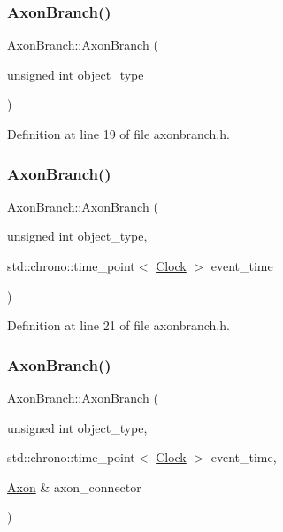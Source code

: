 \subsubsection{\texorpdfstring{Axon\+Branch()}{AxonBranch()}\hspace{0.1cm}{\footnotesize\ttfamily [2/4]}}
{\footnotesize\ttfamily Axon\+Branch\+::\+Axon\+Branch (\begin{DoxyParamCaption}\item[{unsigned int}]{object\+\_\+type }\end{DoxyParamCaption})\hspace{0.3cm}{\ttfamily [inline]}}



Definition at line 19 of file axonbranch.\+h.

\mbox{\label{class_axon_branch_ad6191fcfd8bedc058a4f1cfb5056f5b2}} 
\subsubsection{\texorpdfstring{Axon\+Branch()}{AxonBranch()}\hspace{0.1cm}{\footnotesize\ttfamily [3/4]}}
{\footnotesize\ttfamily Axon\+Branch\+::\+Axon\+Branch (\begin{DoxyParamCaption}\item[{unsigned int}]{object\+\_\+type,  }\item[{std\+::chrono\+::time\+\_\+point$<$ \mbox{\hyperlink{universe_8h_a0ef8d951d1ca5ab3cfaf7ab4c7a6fd80}{Clock}} $>$}]{event\+\_\+time }\end{DoxyParamCaption})\hspace{0.3cm}{\ttfamily [inline]}}



Definition at line 21 of file axonbranch.\+h.

\mbox{\label{class_axon_branch_a98f33462edf82dacab750d1140172912}} 
\subsubsection{\texorpdfstring{Axon\+Branch()}{AxonBranch()}\hspace{0.1cm}{\footnotesize\ttfamily [4/4]}}
{\footnotesize\ttfamily Axon\+Branch\+::\+Axon\+Branch (\begin{DoxyParamCaption}\item[{unsigned int}]{object\+\_\+type,  }\item[{std\+::chrono\+::time\+\_\+point$<$ \mbox{\hyperlink{universe_8h_a0ef8d951d1ca5ab3cfaf7ab4c7a6fd80}{Clock}} $>$}]{event\+\_\+time,  }\item[{\mbox{\hyperlink{class_axon}{Axon}} \&}]{axon\+\_\+connector }\end{DoxyParamCaption})\hspace{0.3cm}{\ttfamily [inline]}}



